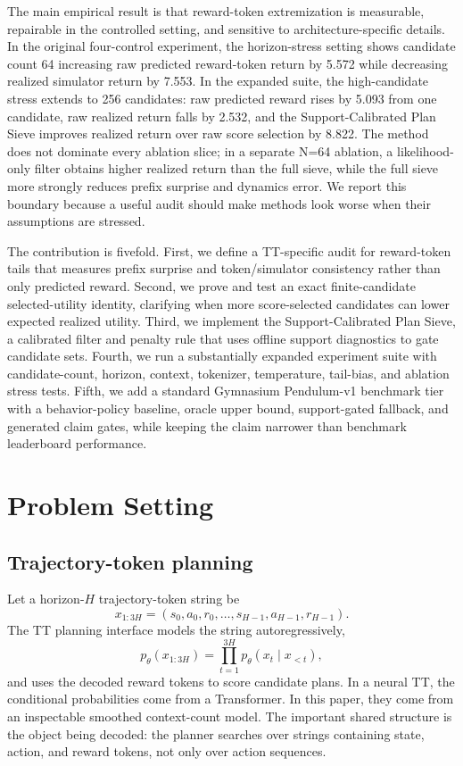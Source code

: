 \documentclass{article}
\newcommand{\method}{Support-Calibrated Plan Sieve}
\begin{document}
The main empirical result is that reward-token extremization is measurable, repairable in the controlled setting, and sensitive to architecture-specific details. In the original four-control experiment, the horizon-stress setting shows candidate count 64 increasing raw predicted reward-token return by 5.572 while decreasing realized simulator return by 7.553. In the expanded suite, the high-candidate stress extends to 256 candidates: raw predicted reward rises by 5.093 from one candidate, raw realized return falls by 2.532, and the \method{} improves realized return over raw score selection by 8.822. The method does not dominate every ablation slice; in a separate N=64 ablation, a likelihood-only filter obtains higher realized return than the full sieve, while the full sieve more strongly reduces prefix surprise and dynamics error. We report this boundary because a useful audit should make methods look worse when their assumptions are stressed.

The contribution is fivefold. First, we define a TT-specific audit for reward-token tails that measures prefix surprise and token/simulator consistency rather than only predicted reward. Second, we prove and test an exact finite-candidate selected-utility identity, clarifying when more score-selected candidates can lower expected realized utility. Third, we implement the \method{}, a calibrated filter and penalty rule that uses offline support diagnostics to gate candidate sets. Fourth, we run a substantially expanded experiment suite with candidate-count, horizon, context, tokenizer, temperature, tail-bias, and ablation stress tests. Fifth, we add a standard Gymnasium Pendulum-v1 benchmark tier with a behavior-policy baseline, oracle upper bound, support-gated fallback, and generated claim gates, while keeping the claim narrower than benchmark leaderboard performance.

\section{Problem Setting}

\subsection{Trajectory-token planning}

Let a horizon-\(H\) trajectory-token string be
\[
x_{1:3H}=(s_0,a_0,r_0,\ldots,s_{H-1},a_{H-1},r_{H-1}).
\]
The TT planning interface models the string autoregressively,
\[
p_\theta(x_{1:3H})=\prod_{t=1}^{3H}p_\theta(x_t\mid x_{<t}),
\]
and uses the decoded reward tokens to score candidate plans. In a neural TT, the conditional probabilities come from a Transformer. In this paper, they come from an inspectable smoothed context-count model. The important shared structure is the object being decoded: the planner searches over strings containing state, action, and reward tokens, not only over action sequences.
\end{document}
